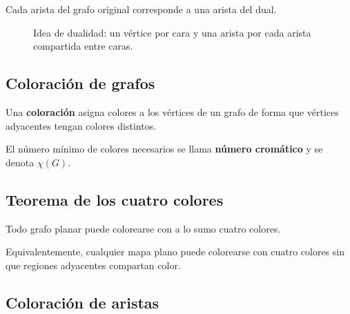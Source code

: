 \documentclass[12pt]{article}
\theoremstyle{plain}
\theoremstyle{definition}
\theoremstyle{remark}
\begin{document}
Cada arista del grafo original corresponde a una arista del dual.

\begin{figure}[htbp]
\centering
{}
\caption{Idea de dualidad: un vértice por cara y una arista por cada arista compartida entre caras.}
\end{figure}

\subsection*{Coloración de grafos}

Una \textbf{coloración} asigna colores a los vértices de un grafo de forma que vértices adyacentes tengan colores distintos.

El número mínimo de colores necesarios se llama \textbf{número cromático} y se denota $\chi(G)$.

\subsection*{Teorema de los cuatro colores}

Todo grafo planar puede colorearse con a lo sumo cuatro colores.

Equivalentemente, cualquier mapa plano puede colorearse con cuatro colores sin que regiones adyacentes compartan color.

\subsection*{Coloración de aristas}
\end{document}
